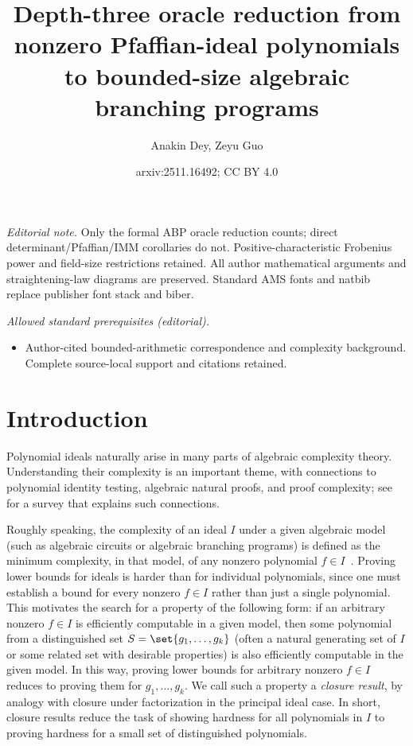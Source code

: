 \documentclass[10pt,a4paper]{amsart}
\title{Depth-three oracle reduction from nonzero Pfaffian-ideal polynomials to bounded-size algebraic branching programs}
\author{Anakin Dey, Zeyu Guo}
\date{arxiv:2511.16492; CC BY 4.0}
\begin{document}
\maketitle
\noindent\textit{Editorial note.} Only the formal ABP oracle reduction counts; direct determinant/Pfaffian/IMM corollaries do not. Positive-characteristic Frobenius power and field-size restrictions retained. All author mathematical arguments and straightening-law diagrams are preserved. Standard AMS fonts and natbib replace publisher font stack and biber.\par\medskip
\noindent\textit{Allowed standard prerequisites (editorial).}\begin{itemize}
\item Author-cited bounded-arithmetic correspondence and complexity background. Complete source-local support and citations retained.
\end{itemize}\medskip
\section{Introduction}\label{sec:intro}

Polynomial ideals naturally arise in many parts of algebraic complexity theory.
Understanding their complexity is an important theme, with connections to polynomial identity testing, algebraic natural proofs, and proof complexity; see~\cite{Grochow20} for a survey that explains such connections.

Roughly speaking, the complexity of an ideal $I$ under a given algebraic model (such as algebraic circuits or algebraic branching programs) is defined as the minimum complexity, in that model, of any nonzero polynomial $f \in I$~\cite{Grochow20}.
Proving lower bounds for ideals is harder than for individual polynomials, since one must establish a bound for every nonzero $f \in I$ rather than just a single polynomial.
This motivates the search for a property of the following form: if an arbitrary nonzero $f \in I$ is efficiently computable in a given model, then some polynomial from a distinguished set $S = \set{g_1, \dots, g_k}$ (often a natural generating set of $I$ or some related set with desirable properties) is also efficiently computable in the given model.
In this way, proving lower bounds for arbitrary nonzero $f \in I$ reduces to proving them for $g_1, \dots, g_k$.
We call such a property a \emph{closure result}, by analogy with closure under factorization in the principal ideal case.
In short, closure results reduce the task of showing hardness for all polynomials in $I$ to proving hardness for a small set of distinguished polynomials.
\end{document}
